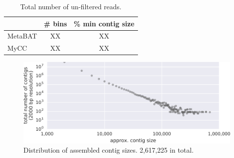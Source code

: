 
\begin{table}[H]
\centering
\begin{tabular}{l | cc}
            & \# bins & \% min contig size \\  %
\midrule
	MetaBAT & XX   & XX \\
	MyCC    & XX   & XX \\
\end{tabular}
\caption{Total number of un-filtered reads.}
\label{table:sample_read_sizes}
\end{table}


\begin{figure}[H]
\centering
    \includegraphics[width=1.0\textwidth]{./tex/chapter2/figures/170123_frac_reads_binned_at_different_contig_lengths_and_total--INKSCAPED.pdf}
    \begin{singlespace}
    \caption[Distribution of contig sizes]{
        Distribution of assembled contig sizes.
        2,617,225 in total.}
    \label{fig:contig_lengths}
    \end{singlespace}
\end{figure}

